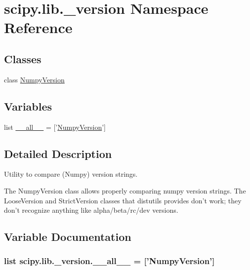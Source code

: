 \hypertarget{namespacescipy_1_1lib_1_1__version}{}\section{scipy.\+lib.\+\_\+version Namespace Reference}
\label{namespacescipy_1_1lib_1_1__version}
\subsection*{Classes}
\begin{DoxyCompactItemize}
\item 
class \hyperlink{classscipy_1_1lib_1_1__version_1_1NumpyVersion}{Numpy\+Version}
\end{DoxyCompactItemize}
\subsection*{Variables}
\begin{DoxyCompactItemize}
\item 
list \hyperlink{namespacescipy_1_1lib_1_1__version_a1d6c805d0e14b0d883de6d13240cbb0c}{\+\_\+\+\_\+all\+\_\+\+\_\+} = \mbox{[}'\hyperlink{classscipy_1_1lib_1_1__version_1_1NumpyVersion}{Numpy\+Version}'\mbox{]}
\end{DoxyCompactItemize}


\subsection{Detailed Description}
\begin{DoxyVerb}Utility to compare (Numpy) version strings.

The NumpyVersion class allows properly comparing numpy version strings.
The LooseVersion and StrictVersion classes that distutils provides don't
work; they don't recognize anything like alpha/beta/rc/dev versions.\end{DoxyVerb}
 

\subsection{Variable Documentation}
\hypertarget{namespacescipy_1_1lib_1_1__version_a1d6c805d0e14b0d883de6d13240cbb0c}{}
\subsubsection[{\+\_\+\+\_\+all\+\_\+\+\_\+}]{\setlength{\rightskip}{0pt plus 5cm}list scipy.\+lib.\+\_\+version.\+\_\+\+\_\+all\+\_\+\+\_\+ = \mbox{[}'{\bf Numpy\+Version}'\mbox{]}}\label{namespacescipy_1_1lib_1_1__version_a1d6c805d0e14b0d883de6d13240cbb0c}
